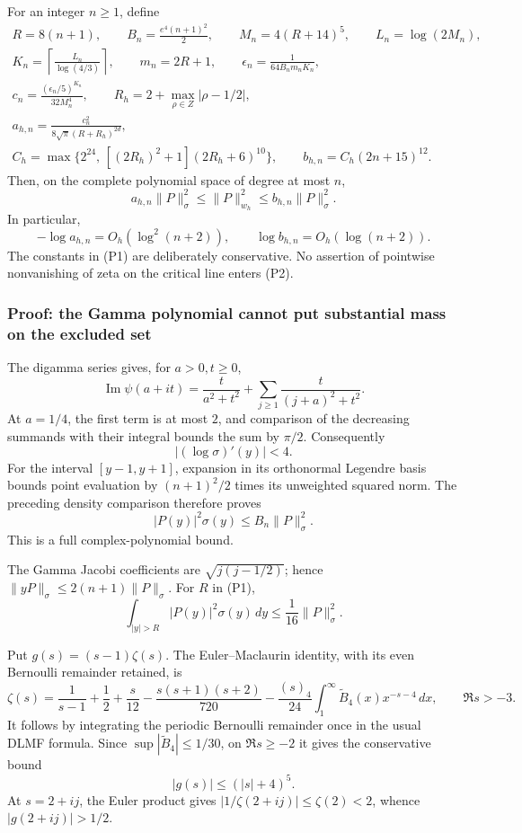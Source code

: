 For an integer \(n\ge1\), define \[
\begin{gathered}
R=8(n+1),\qquad B_n=\frac{e^4(n+1)^2}{2},\qquad
M_n=4(R+14)^5,\qquad L_n=\log(2M_n),\\
K_n=\left\lceil\frac{L_n}{\log(4/3)}\right\rceil,\qquad m_n=2R+1,\qquad
\epsilon_n=\frac1{64B_nm_nK_n},\\
c_n=\frac{(\epsilon_n/5)^{K_n}}{32M_n^4},\qquad
R_h=2+\max_{\rho\in Z}|\rho-1/2|,\\
a_{h,n}=\frac{c_n^2}{8\sqrt\pi(R+R_h)^{2d}},\\
C_h=\max\{2^{24},\,[(2R_h)^2+1](2R_h+6)^{10}\},\qquad
b_{h,n}=C_h(2n+15)^{12}.
\end{gathered} \tag{P1}
\] Then, on the complete polynomial space of degree at most \(n\), \[
\boxed{
 a_{h,n}\|P\|_\sigma^2\le\|P\|_{w_h}^2
 \le b_{h,n}\|P\|_\sigma^2 .
} \tag{P2}
\] In particular, \[
-\log a_{h,n}=O_h(\log^2(n+2)),\qquad
\log b_{h,n}=O_h(\log(n+2)). \tag{P3}
\] The constants in (P1) are deliberately conservative. No assertion of pointwise nonvanishing of zeta on the critical line enters (P2).

\subsubsection{Proof: the Gamma polynomial cannot put substantial mass on the excluded set}\label{proof-the-gamma-polynomial-cannot-put-substantial-mass-on-the-excluded-set}

The digamma series gives, for \(a>0,t\ge0\), \[
\operatorname{Im}\psi(a+it)
=\frac{t}{a^2+t^2}+\sum_{j\ge1}\frac{t}{(j+a)^2+t^2}.
\] At \(a=1/4\), the first term is at most \(2\), and comparison of the decreasing summands with their integral bounds the sum by \(\pi/2\). Consequently \[
|(\log\sigma)'(y)|<4.
\] For the interval \([y-1,y+1]\), expansion in its orthonormal Legendre basis bounds point evaluation by \((n+1)^2/2\) times its unweighted squared norm. The preceding density comparison therefore proves \[
 |P(y)|^2\sigma(y)\le B_n\|P\|_\sigma^2. \tag{P4}
\] This is a full complex-polynomial bound.

The Gamma Jacobi coefficients are \(\sqrt{j(j-1/2)}\); hence \(\|yP\|_\sigma\le2(n+1)\|P\|_\sigma\). For \(R\) in (P1), \[
 \int_{|y|>R}|P(y)|^2\sigma(y)\,dy
 \le\frac1{16}\|P\|_\sigma^2. \tag{P5}
\]

Put \(g(s)=(s-1)\zeta(s)\). The Euler--Maclaurin identity, with its even Bernoulli remainder retained, is \[
\zeta(s)=\frac1{s-1}+\frac12+\frac{s}{12}
-\frac{s(s+1)(s+2)}{720}
-\frac{(s)_4}{24}\int_1^\infty
 \widetilde B_4(x)x^{-s-4}\,dx,\qquad \Re s>-3.
\] It follows by integrating the periodic Bernoulli remainder once in the usual DLMF formula. Since \(\sup|\widetilde B_4|\le1/30\), on \(\Re s\ge-2\) it gives the conservative bound \[
 |g(s)|\le(|s|+4)^5. \tag{P6}
\] At \(s=2+ij\), the Euler product gives \(|1/\zeta(2+ij)|\le\zeta(2)<2\), whence \(|g(2+ij)|>1/2\).

